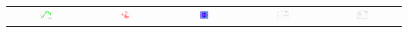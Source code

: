 \documentclass{beamer}
\begin{document}
\begin{frame}[containsverbatim]
  \begin{tabular}{@{}c@{}c@{}c@{}c@{}c@{}}
  \includegraphics[width=0.2\textwidth]{figures/plot_kriging.png}&
  \includegraphics[width=0.2\textwidth]{figures/plot_random_walk.png}&
  \includegraphics[width=0.2\textwidth]{figures/plot_sobol_field.png}&
  \includegraphics[width=0.2\textwidth]{figures/plot_monte_carlo.png}&
  \includegraphics[width=0.2\textwidth]{figures/plot_distribution_fitting.png}
  \end{tabular}
\end{frame}
  

\end{document}
